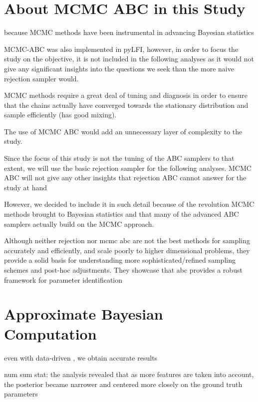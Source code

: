 \section{About MCMC ABC in this Study}

because MCMC methods have been instrumental in advancing Bayesian statistics

MCMC-ABC was also implemented in pyLFI, however, in order to focus the study on the objective, it is not included in the following analyses as it would not give any significant insights into the questions we seek than the more naive rejection sampler would. 

MCMC methods require a great deal of tuning and diagnosis in order to ensure that the chains actually have converged towards the stationary distribution and sample efficiently (has good mixing).

The use of MCMC ABC would add an unnecessary layer of complexity to the study.

Since the focus of this study is not the tuning of the ABC samplers to that extent, we will use the basic rejection sampler for the following analyses. MCMC ABC will not give any other insights that rejection ABC cannot answer for the study at hand 

However, we decided to include it in such detail because of the revolution MCMC methods brought to Bayesian statistics and that many of the advanced ABC samplers actually build on the MCMC approach. 

Although neither rejection nor mcmc abc are not the best methods for sampling accurately and efficiently, and scale poorly to higher dimensional problems, they provide a solid basis for understanding more sophisticated/refined sampling schemes and post-hoc adjustments. They showcase that abc provides a robust framework for parameter identification

\section{Approximate Bayesian Computation}

even with data-driven , we obtain accurate results

num sum stat: the analysis revealed that as more features are taken into account, the posterior became narrower and centered more closely on the ground truth parameters

